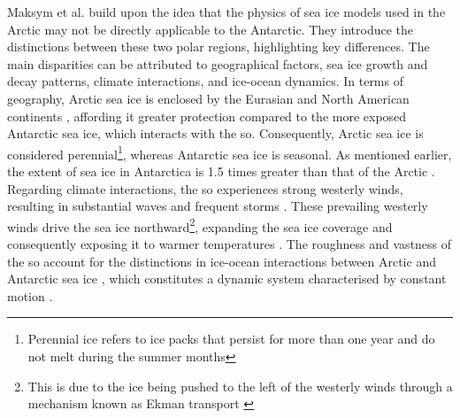 Maksym et al. \cite{Maksym2012} build upon the idea that the physics of sea ice models used in the Arctic may not be directly applicable to the Antarctic. They introduce the distinctions between these two polar regions, highlighting key differences. The main disparities can be attributed to geographical factors, sea ice growth and decay patterns, climate interactions, and ice-ocean dynamics. In terms of geography, Arctic sea ice is enclosed by the Eurasian and North American continents \cite{Maksym2012, Parkinson2004}, affording it greater protection compared to the more exposed Antarctic sea ice, which interacts with the \acs{so}. Consequently, Arctic sea ice is considered perennial\footnote{Perennial ice refers to ice packs that persist for more than one year and do not melt during the summer months}, whereas Antarctic sea ice is seasonal. As mentioned earlier, the extent of sea ice in Antarctica is 1.5 times greater than that of the Arctic \cite{Thomas2017Chap8}. Regarding climate interactions, the \acs{so} experiences strong westerly winds, resulting in substantial waves and frequent storms \cite{Maksym2012}. These prevailing westerly winds drive the sea ice northward\footnote{This is due to the ice being pushed to the left of the westerly winds through a mechanism known as Ekman transport \cite{Maksym2012}}, expanding the sea ice coverage and consequently exposing it to warmer temperatures \cite{Parkinson2004, Maksym2012}. The roughness and vastness of the \acs{so} account for the distinctions in ice-ocean interactions between Arctic and Antarctic sea ice \cite{Parkinson2004}, which constitutes a dynamic system characterised by constant motion \cite{Maksym2012}.

